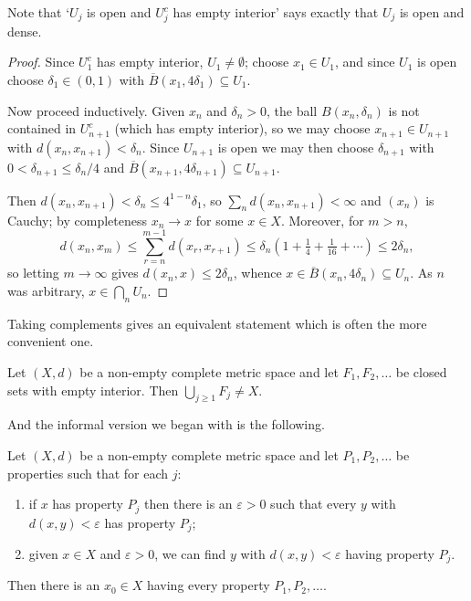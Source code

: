 \documentclass[a4paper]{scrartcl}
\begin{document}
Note that `$U_j$ is open and $U_j^c$ has empty interior' says exactly that $U_j$ is open and dense.

\begin{proof}
	Since $U_1^c$ has empty interior, $U_1 \neq\emptyset$; choose $x_1\in U_1$, and since $U_1$ is open choose $\delta_1 \in (0,1)$ with $\overline B(x_1,4\delta_1)\subseteq U_1$.

	Now proceed inductively. Given $x_n$ and $\delta_n>0$, the ball $B(x_n,\delta_n)$ is not contained in $U_{n+1}^c$ (which has empty interior), so we may choose $x_{n+1}\in U_{n+1}$ with $d(x_n,x_{n+1})<\delta_n$. Since $U_{n+1}$ is open we may then choose $\delta_{n+1}$ with $0<\delta_{n+1}\leq\delta_n/4$ and $\overline B(x_{n+1},4\delta_{n+1})\subseteq U_{n+1}$.

	Then $d(x_n,x_{n+1})<\delta_n \leq 4^{1-n}\delta_1$, so $\sum_n d(x_n,x_{n+1})<\infty$ and $(x_n)$ is Cauchy; by completeness $x_n \to x$ for some $x\in X$. Moreover, for $m>n$,
	$$d(x_n,x_m)\leq\sum_{r=n}^{m-1}d(x_r,x_{r+1}) \leq \delta_n\left(1+\tfrac14+\tfrac1{16}+\cdots\right)\leq 2\delta_n,$$
	so letting $m\to\infty$ gives $d(x_n,x)\leq2\delta_n$, whence $x\in \overline B(x_n,4\delta_n)\subseteq U_n$. As $n$ was arbitrary, $x\in\bigcap_nU_n$.
\end{proof}

Taking complements gives an equivalent statement which is often the more convenient one.

\begin{theorem}\label{thm:baire-closed}
	Let $(X,d)$ be a non-empty complete metric space and let $F_1,F_2,\ldots$ be closed sets with empty interior. Then $\bigcup_{j\geq1}F_j\neq X$.
\end{theorem}

And the informal version we began with is the following.

\begin{theorem}\label{thm:baire-properties}
	Let $(X,d)$ be a non-empty complete metric space and let $P_1,P_2,\ldots$ be properties such that for each $j$:
	\begin{enumerate}[label=(\roman*)]
		\item if $x$ has property $P_j$ then there is an $\varepsilon>0$ such that every $y$ with $d(x,y)<\varepsilon$ has property $P_j$;
		\item given $x\in X$ and $\varepsilon>0$, we can find $y$ with $d(x,y)<\varepsilon$ having property $P_j$.
	\end{enumerate}
	Then there is an $x_0\in X$ having every property $P_1,P_2,\ldots$.
\end{theorem}
\end{document}
